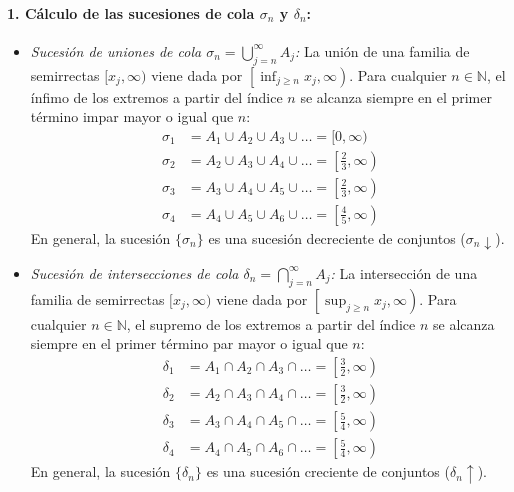 \begin{problema}
\paragraph{1. Cálculo de las sucesiones de cola $\sigma_n$ y $\delta_n$:}
\begin{itemize}
    \item \textit{Sucesión de uniones de cola $\sigma_n = \bigcup_{j=n}^\infty A_j$:}
    La unión de una familia de semirrectas $[x_j, \infty)$ viene dada por $\left[ \inf_{j \ge n} x_j, \infty \right)$.
    Para cualquier $n \in \mathbb{N}$, el ínfimo de los extremos a partir del índice $n$ se alcanza siempre en el primer término impar mayor o igual que $n$:
    \begin{align*}
        \sigma_1 &= A_1 \cup A_2 \cup A_3 \cup \dots = [0, \infty) \\
        \sigma_2 &= A_2 \cup A_3 \cup A_4 \cup \dots = \left[\frac{2}{3}, \infty\right) \\
        \sigma_3 &= A_3 \cup A_4 \cup A_5 \cup \dots = \left[\frac{2}{3}, \infty\right) \\
        \sigma_4 &= A_4 \cup A_5 \cup A_6 \cup \dots = \left[\frac{4}{5}, \infty\right)
    \end{align*}
    En general, la sucesión $\{\sigma_n\}$ es una sucesión decreciente de conjuntos ($\sigma_n \downarrow$).

    \item \textit{Sucesión de intersecciones de cola $\delta_n = \bigcap_{j=n}^\infty A_j$:}
    La intersección de una familia de semirrectas $[x_j, \infty)$ viene dada por $\left[ \sup_{j \ge n} x_j, \infty \right)$.
    Para cualquier $n \in \mathbb{N}$, el supremo de los extremos a partir del índice $n$ se alcanza siempre en el primer término par mayor o igual que $n$:
    \begin{align*}
        \delta_1 &= A_1 \cap A_2 \cap A_3 \cap \dots = \left[\frac{3}{2}, \infty\right) \\
        \delta_2 &= A_2 \cap A_3 \cap A_4 \cap \dots = \left[\frac{3}{2}, \infty\right) \\
        \delta_3 &= A_3 \cap A_4 \cap A_5 \cap \dots = \left[\frac{5}{4}, \infty\right) \\
        \delta_4 &= A_4 \cap A_5 \cap A_6 \cap \dots = \left[\frac{5}{4}, \infty\right)
    \end{align*}
    En general, la sucesión $\{\delta_n\}$ es una sucesión creciente de conjuntos ($\delta_n \uparrow$).
\end{itemize}


\end{problema}
